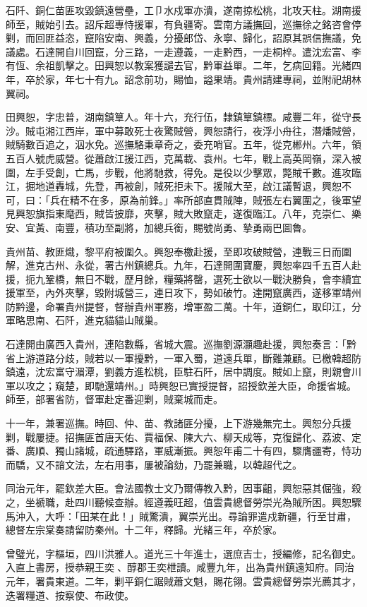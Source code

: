 \begin{pinyinscope}
石阡、銅仁苗匪攻毀鎮遠營壘，工⼙水戍軍亦潰，遂南掠松桃，北攻天柱。湖南援師至，賊始引去。詔斥超專恃援軍，有負疆寄。雲南方議撫回，巡撫徐之銘咨會停剿，而回匪益恣，竄陷安南、興義，分擾郎岱、永寧、歸化，詔原其誤信撫議，免議處。石達開自川回竄，分三路，一走遵義，一走黔西，一走桐梓。遣沈宏富、李有恆、余祖凱擊之。田興恕以教案獲譴去官，黔軍益單。二年，乞病回籍。光緒四年，卒於家，年七十有九。詔念前功，賜恤，謚果靖。貴州請建專祠，並附祀胡林翼祠。

田興恕，字忠普，湖南鎮筸人。年十六，充行伍，隸鎮筸鎮標。咸豐二年，從守長沙。賊屯湘江西岸，軍中募敢死士夜驚賊營，興恕請行，夜浮小舟往，潛燔賊營，賊騎數百追之，泅水免。巡撫駱秉章奇之，委充哨官。五年，從克郴州。六年，領五百人號虎威營。從蕭啟江援江西，克萬載、袁州。七年，戰上高英岡嶺，深入被圍，左手受創，亡馬，步戰，他將馳救，得免。是役以少擊眾，斃賊千數。進攻臨江，掘地道轟城，先登，再被創，賊死拒未下。援賊大至，啟江議暫退，興恕不可，曰：「兵在精不在多，原為前鋒。」率所部直貫賊陣，賊張左右翼圍之，後軍望見興恕旗指東麾西，賊皆披靡，夾擊，賊大敗竄走，遂復臨江。八年，克崇仁、樂安、宜黃、南豐，積功至副將，加總兵銜，賜號尚勇、摯勇兩巴圖魯。

貴州苗、教匪熾，黎平府被圍久。興恕奉檄赴援，至即攻破賊營，連戰三日而圍解，進克古州、永從，署古州鎮總兵。九年，石達開圍寶慶，興恕率四千五百人赴援，扼九鞏橋，無日不戰，歷月餘，糧藥將罄，選死士欲以一戰決勝負，會李續宜援軍至，內外夾擊，毀附城營三，連日攻下，勢如破竹。達開竄廣西，遂移軍靖州防黔邊，命署貴州提督，督辦貴州軍務，增軍盈二萬。十年，道銅仁，取印江，分軍略思南、石阡，進克貓貓山賊巢。

石達開由廣西入貴州，連陷數縣，省城大震。巡撫劉源灝趣赴援，興恕奏言：「黔省上游道路分歧，賊若以一軍擾黔，一軍入蜀，道遠兵單，斷難兼顧。已檄韓超防鎮遠，沈宏富守湄潭，劉義方進松桃，臣駐石阡，居中調度。賊如上竄，則親會川軍以攻之；窺楚，即馳還靖州。」時興恕已實授提督，詔授欽差大臣，命援省城。師至，部署省防，督軍赴定番迎剿，賊棄城而走。

十一年，兼署巡撫。時回、仲、苗、教諸匪分擾，上下游幾無完土。興恕分兵援剿，戰屢捷。招撫匪首唐天佑、賈福保、陳大六、柳天成等，克復歸化、荔波、定番、廣順、獨山諸城，疏通驛路，軍威漸振。興恕年甫二十有四，驟膺疆寄，恃功而驕，又不諳文法，左右用事，屢被論劾，乃罷兼職，以韓超代之。

同治元年，罷欽差大臣。會法國教士文乃爾傳教入黔，因事齟，興恕惡其倔強，殺之，坐褫職，赴四川聽候查辦。經遵義旺超，值雲貴總督勞崇光為賊所困。興恕驟馬沖入，大呼：「田某在此！」賊驚潰，翼崇光出。尋論罪遣戍新疆，行至甘肅，總督左宗棠奏請留防秦州。十二年，釋歸。光緒三年，卒於家。

曾璧光，字樞垣，四川洪雅人。道光三十年進士，選庶吉士，授編修，記名御史。入直上書房，授恭親王奕、醇郡王奕枻讀。咸豐九年，出為貴州鎮遠知府。同治元年，署貴東道。二年，剿平銅仁踞賊蕭文魁，賜花翎。雲貴總督勞崇光薦其才，迭署糧道、按察使、布政使。


\end{pinyinscope}
